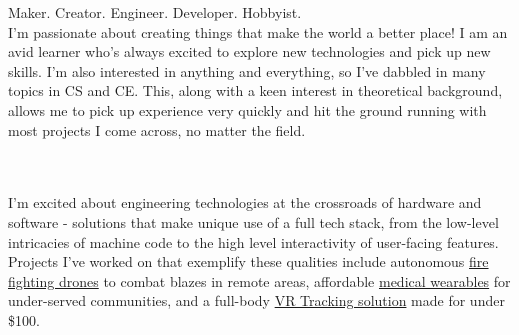 \documentclass[9pt]{developercv} %
\begin{document}
\vspace{0.5em}

\begin{minipage}[t]{0.45\textwidth} %
	\vspace{-\baselineskip} %
	\large Maker. Creator. Engineer. Developer. Hobbyist.
	\\

	\normalsize
	I'm passionate about creating things that make the world a better place!
	I am an avid learner who's always excited to explore new technologies and pick up new skills.
	I'm also interested in anything and everything, so I've dabbled in many topics in CS and CE.
	This, along with a keen interest in theoretical background, allows me to pick up experience very quickly and hit the ground running with most projects I come across, no matter the field.
\end{minipage}
\hfill %
\begin{minipage}[t]{0.5\textwidth} %
	\vspace{-3\baselineskip} %
	\begin{center}  \end{center}
	\begin{barchart}{5.5}
	\end{barchart}
\end{minipage}
\\
\\
I'm excited about engineering technologies at the crossroads of hardware and software - solutions that make unique use of a full tech stack, from the low-level intricacies of machine code to the high level interactivity of user-facing features.
Projects I've worked on that exemplify these qualities include
autonomous \href{https://devpost.com/software/phoenix-3nzy29}{fire fighting drones} to combat blazes in remote areas,
affordable \href{https://github.com/Cosmic-Goat/ViKi}{medical wearables} for under-served communities,
and a full-body \href{https://github.com/Cosmic-Goat/Track-O-Tron}{VR Tracking solution} made for under \$100.

\hfill

\vspace{1em}
\vspace{-2em}
\end{document}
